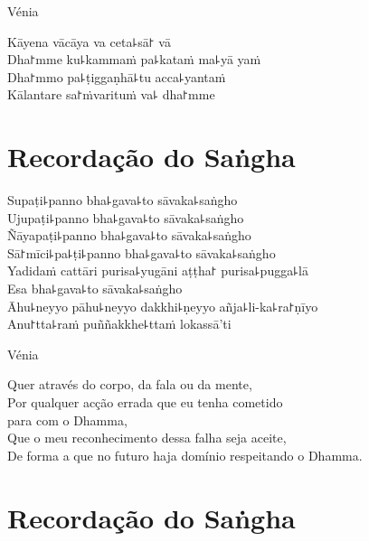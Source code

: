 \clearpage

\begin{instruction}
  Vénia
\end{instruction}

Kāyena vācāya va ceta꜕sā꜓ vā\\
Dha꜓mme ku꜕kammaṁ pa꜕kataṁ ma꜕yā yaṁ\\
Dha꜓mmo pa꜕ṭiggaṇhā꜕tu acca꜕yantaṁ\\
Kālantare sa꜓ṁvarituṁ va꜕ dha꜓mme

\chapter*{Recordação do Saṅgha}

\delegateSetUseNext

\begin{leader}
\end{leader}

Supaṭi꜕panno bha꜕gava꜕to sāvaka꜕saṅgho\\
Ujupaṭi꜕panno bha꜕gava꜕to sāvaka꜕saṅgho\\
Ñāyapaṭi꜕panno bha꜕gava꜕to sāvaka꜕saṅgho\\
Sā꜓mīci꜕pa꜕ṭi꜕panno bha꜕gava꜕to sāvaka꜕saṅgho\\
Yadidaṁ cattāri purisa꜕yugāni aṭṭha꜓ purisa꜕pugga꜕lā\\
Esa bha꜕gava꜕to sāvaka꜕saṅgho\\
Āhu꜕neyyo pāhu꜕neyyo dakkhi꜕ṇeyyo añja꜕li-ka꜕ra꜓ṇīyo\\
Anu꜓tta꜕raṁ puññakkhe꜕ttaṁ lokassā'ti

\clearpage

\begin{instruction}
  Vénia
\end{instruction}

Quer através do corpo, da fala ou da mente,\\
Por qualquer acção errada que eu tenha cometido\\
\vin para com o Dhamma,\\
Que o meu reconhecimento dessa falha seja aceite,\\
De forma a que no futuro haja domínio respeitando o Dhamma.

\chapter{Recordação do Saṅgha}

\begin{leader}
\end{leader}

